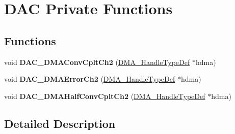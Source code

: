 \hypertarget{group___d_a_c_ex___private___functions}{}\section{D\+AC Private Functions}
\label{group___d_a_c_ex___private___functions}
\subsection*{Functions}
\begin{DoxyCompactItemize}
\item 
\mbox{\label{group___d_a_c_ex___private___functions_ga55af4c0ba08114de3bf33da8f7dd8c2d}} 
void {\bfseries D\+A\+C\+\_\+\+D\+M\+A\+Conv\+Cplt\+Ch2} (\mbox{\hyperlink{group___d_m_a___exported___types_ga41b754a906b86bce54dc79938970138b}{D\+M\+A\+\_\+\+Handle\+Type\+Def}} $\ast$hdma)
\item 
\mbox{\label{group___d_a_c_ex___private___functions_ga5c7cd88fe87cc3ac2395fdb30ed523af}} 
void {\bfseries D\+A\+C\+\_\+\+D\+M\+A\+Error\+Ch2} (\mbox{\hyperlink{group___d_m_a___exported___types_ga41b754a906b86bce54dc79938970138b}{D\+M\+A\+\_\+\+Handle\+Type\+Def}} $\ast$hdma)
\item 
\mbox{\label{group___d_a_c_ex___private___functions_ga380b73079b417164d4e7a3dd3d31f5ed}} 
void {\bfseries D\+A\+C\+\_\+\+D\+M\+A\+Half\+Conv\+Cplt\+Ch2} (\mbox{\hyperlink{group___d_m_a___exported___types_ga41b754a906b86bce54dc79938970138b}{D\+M\+A\+\_\+\+Handle\+Type\+Def}} $\ast$hdma)
\end{DoxyCompactItemize}


\subsection{Detailed Description}
